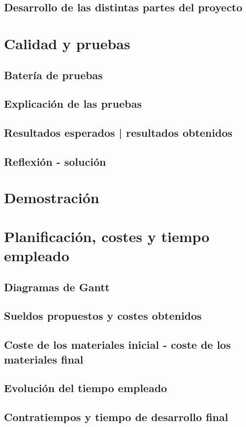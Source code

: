 \section{Desarrollo de las distintas partes del proyecto}
\chapter{Calidad y pruebas}
\section{Batería de pruebas}
\section{Explicación de las pruebas}
\section{Resultados esperados | resultados obtenidos}
\section{Reflexión - solución}
\chapter{Demostración}
\chapter{Planificación, costes y tiempo empleado}
\section{Diagramas de Gantt}
\section{Sueldos propuestos y costes obtenidos}
\section{Coste de los materiales inicial - coste de los materiales final}
\section{Evolución del tiempo empleado}
\section{Contratiempos y tiempo de desarrollo final}
